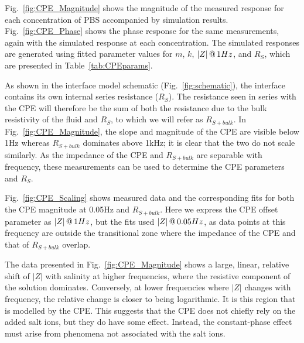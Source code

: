 \documentclass[journal, a4paper]{IEEEtran}
\begin{document}
Fig.~\ref{fig:CPE_Magnitude} shows the magnitude of the measured response {\color{blue}for each concentration of PBS} accompanied by simulation results. Fig.~\ref{fig:CPE_Phase} shows the phase response for the same measurements, again with the simulated response at each concentration. The simulated responses are generated using fitted parameter values for {\color{blue} $m$, $k$, $|Z|\thinspace @\thinspace 1Hz$, and $R_S$, which are} presented in Table~\ref{tab:CPEparams}.

As shown in the interface model schematic (Fig.~\ref{fig:schematic}), the interface contains its own internal series resistance ($R_{S}$). The resistance seen in series with the CPE will therefore be the sum of both the resistance due to the bulk resistivity of the fluid and $R_{S}$, to which we will refer as $R_{S+bulk}$.
In Fig.~\ref{fig:CPE_Magnitude}, the slope and magnitude of the CPE are visible below 1\thinspace Hz whereas $R_{S+bulk}$  dominates above 1\thinspace kHz; it is clear that the two do not scale similarly.
As the impedance of the CPE and $R_{S+bulk}$ are separable with frequency, these measurements can be used to determine the CPE parameters and $R_{S}$.

Fig.~\ref{fig:CPE_Scaling} shows measured data and the corresponding fits for both the CPE magnitude at 0.05\thinspace Hz and $R_{S+bulk}$. Here we express the CPE offset parameter as $|Z|\thinspace @ \thinspace 1Hz$, but the fits used $|Z|\thinspace @ \thinspace 0.05Hz$, as data points at this frequency are outside the transitional zone where the impedance of the CPE and that of $R_{S+bulk}$ overlap.

The data presented in Fig.~\ref{fig:CPE_Magnitude} shows a large, linear, relative shift of $|Z|$ with salinity at higher frequencies, where the resistive component of the solution dominates.
Conversely, at lower frequencies where $|Z|$ changes with frequency, the relative change is closer to being logarithmic. It is this region that is modelled by the CPE.
This suggests that the CPE does not chiefly rely on the added salt ions, but they do have some effect.
Instead, the constant-phase effect must arise from phenomena not associated with the salt ions.
\end{document}
